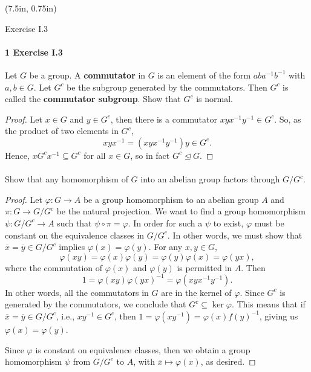 \documentclass[12pt]{article}
\newlength{\myparskip}
\newenvironment{fullbox}{\begin{lrbox}{\savefullbox}\begin{minipage}{\dimexpr\textwidth-2\fboxsep\relax}\setlength{\parskip}{\myparskip}}{\end{minipage}\end{lrbox}\framebox[\textwidth]{\usebox{\savefullbox}}}
\newenvironment{pbox}[1][]{\begin{fullbox}\ifx#1\empty\else\paragraph{#1}\fi}{\end{fullbox}}
\renewcommand{\phi}{\varphi}
\newcommand{\<}{\langle}
\renewcommand{\>}{\rangle}
\newcommand{\eqc}{\overline}
\newcommand{\teq}{\trianglelefteq}
\begin{document}
\thispagestyle{title}

\begin{textblock*}{0in}(7.5in, 0.75in)
\end{textblock*}

\begin{pbox}[1 Exercise I.3]
    Let $G$ be a group. A \textbf{commutator} in $G$ is an element of the form $aba^{-1}b^{-1}$ with $a, b \in G$. Let $G^c$ be the subgroup generated by the commutators. Then $G^c$ is called the \textbf{commutator subgroup}. Show that $G^c$ is normal.
\end{pbox}

\begin{proof}
    Let $x \in G$ and $y \in G^c$, then there is a commutator $xyx^{-1}y^{-1} \in G^c$. So, as the product of two elements in $G^c$,
    \[
        xyx^{-1} = (xyx^{-1}y^{-1})y \in G^c.
    \]
    Hence, $xG^cx^{-1} \subseteq G^c$ for all $x \in G$, so in fact $G^c \teq G$.

\end{proof}

\begin{pbox}
    Show that any homomorphism of $G$ into an abelian group factors through $G/G^c$.
\end{pbox}

\begin{proof}
    Let $\phi : G \to A$ be a group homomorphism to an abelian group $A$ and $\pi : G \to G/G^c$ be the natural projection. We want to find a group homomorphism $\psi : G/G^c \to A$ such that $\psi \circ \pi = \phi$. In order for such a $\psi$ to exist, $\phi$ must be constant on the equivalence classes in $G/G^c$. In other words, we must show that $\eqc{x} = \eqc{y} \in G/G^c$ implies $\phi(x) = \phi(y)$. For any $x, y \in G$,
    \[
        \phi(xy) = \phi(x)\phi(y) = \phi(y)\phi(x) = \phi(yx),
    \]
    where the commutation of $\phi(x)$ and $\phi(y)$ is permitted in $A$. Then
    \[
        1 = \phi(xy) \phi(yx)^{-1} = \phi(xyx^{-1}y^{-1}).
    \]
    In other words, all the commutators in $G$ are in the kernel of $\phi$. Since $G^c$ is generated by the commutators, we conclude that $G^c \subseteq \ker \phi$. This means that if $\eqc{x} = \eqc{y} \in G/G^c$, i.e., $xy^{-1} \in G^c$, then $1 = \phi(xy^{-1}) = \phi(x)f(y)^{-1}$, giving us $\phi(x) = \phi(y)$.

    Since $\phi$ is constant on equivalence classes, then we obtain a group homomorphism $\psi$ from $G/G^c$ to $A$, with $\eqc{x} \mapsto \phi(x)$, as desired.

\end{proof}
\end{document}
